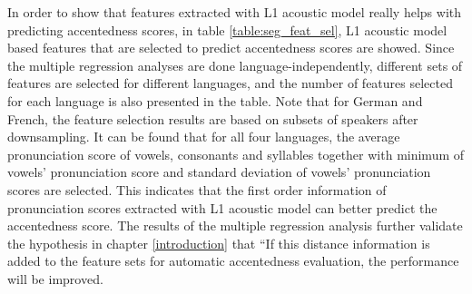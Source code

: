 In order to show that features extracted with L1 acoustic model really helps with predicting accentedness scores, in table \ref{table:seg_feat_sel}, L1 acoustic model based features that are selected to predict accentedness scores are showed. Since the multiple regression analyses are done language-independently, different sets of features are selected for different languages, and the number of features selected for each language is also presented in the table. Note that for German and French, the feature selection results are based on subsets of speakers after downsampling. It can be found that for all four languages, the average pronunciation score of vowels, consonants and syllables together with minimum of vowels' pronunciation score and standard deviation of vowels' pronunciation scores are selected. This indicates that the first order information of pronunciation scores extracted with L1 acoustic model can better predict the accentedness score. The results of the multiple regression analysis further validate the hypothesis in chapter \ref{introduction} that ``If this distance information is added to the feature sets for automatic accentedness evaluation, the performance will be improved.

